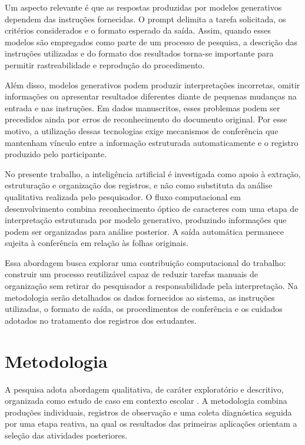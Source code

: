 Um aspecto relevante é que as respostas produzidas por modelos generativos dependem das instruções fornecidas. O prompt delimita a tarefa solicitada, os critérios considerados e o formato esperado da saída. Assim, quando esses modelos são empregados como parte de um processo de pesquisa, a descrição das instruções utilizadas e do formato dos resultados torna-se importante para permitir rastreabilidade e reprodução do procedimento.

Além disso, modelos generativos podem produzir interpretações incorretas, omitir informações ou apresentar resultados diferentes diante de pequenas mudanças na entrada e nas instruções. Em dados manuscritos, esses problemas podem ser precedidos ainda por erros de reconhecimento do documento original. Por esse motivo, a utilização dessas tecnologias exige mecanismos de conferência que mantenham vínculo entre a informação estruturada automaticamente e o registro produzido pelo participante.

No presente trabalho, a inteligência artificial é investigada como apoio à extração, estruturação e organização dos registros, e não como substituta da análise qualitativa realizada pelo pesquisador. O fluxo computacional em desenvolvimento combina reconhecimento óptico de caracteres com uma etapa de interpretação estruturada por modelo generativo, produzindo informações que podem ser organizadas para análise posterior. A saída automática permanece sujeita à conferência em relação às folhas originais.

Essa abordagem busca explorar uma contribuição computacional do trabalho: construir um processo reutilizável capaz de reduzir tarefas manuais de organização sem retirar do pesquisador a responsabilidade pela interpretação. Na metodologia serão detalhados os dados fornecidos ao sistema, as instruções utilizadas, o formato de saída, os procedimentos de conferência e os cuidados adotados no tratamento dos registros dos estudantes.

\section{Metodologia}

A pesquisa adota abordagem qualitativa, de caráter exploratório e
descritivo, organizada como estudo de caso em contexto escolar
\cite{andre2013}. A metodologia combina produções individuais,
registros de observação e uma coleta diagnóstica seguida por uma etapa reativa, na qual os resultados das primeiras aplicações orientam a seleção das atividades posteriores.

